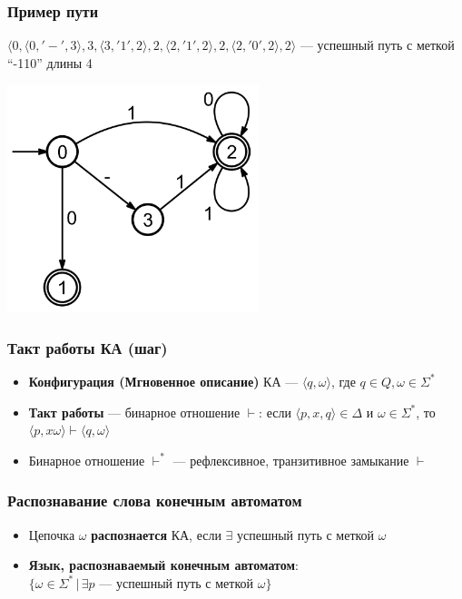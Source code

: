 \documentclass{beamer}
\begin{document}
\begin{frame}[fragile]
  \transwipe[direction=90]
  \frametitle{Пример пути}

  $\langle 0, \langle 0, '-', 3 \rangle, 3, \langle 3, '1', 2 \rangle, 2, \langle 2, '1', 2 \rangle, 2, \langle 2, '0', 2 \rangle, 2\rangle$ --- успешный путь с меткой ``-110'' длины 4

  \begin{center}
     \includegraphics[width=0.55\textwidth]{pics/automaton.png}  
   \end{center}
\end{frame}

\begin{frame}[fragile]
  \transwipe[direction=90]
  \frametitle{Такт работы КА (шаг)}
  \begin{itemize}
    \item \textbf{Конфигурация (Мгновенное описание)} КА --- $\langle q, \omega \rangle$, где $q \in Q, \omega \in \Sigma^*$
    \item \textbf{Такт работы} --- бинарное отношение $\vdash$: если $\langle p , x , q \rangle \in \Delta$ и $\omega \in \Sigma ^*$, то $\langle p , x \omega \rangle \vdash \langle q , \omega \rangle$
    \item Бинарное отношение $\vdash^*$ --- рефлексивное, транзитивное замыкание $\vdash$
  \end{itemize}
\end{frame}

\begin{frame}[fragile]
  \transwipe[direction=90]
  \frametitle{Распознавание слова конечным автоматом}
  \begin{itemize}
    \item Цепочка $\omega$ \textbf{распознается} КА, если $\exists$ успешный путь с меткой $\omega$

    \item \textbf{Язык, распознаваемый конечным автоматом}: \\ $\{ \omega \in \Sigma^* \, | \, \exists p$ --- успешный путь с меткой $\omega \}$
  \end{itemize}
\end{frame}
\end{document}
